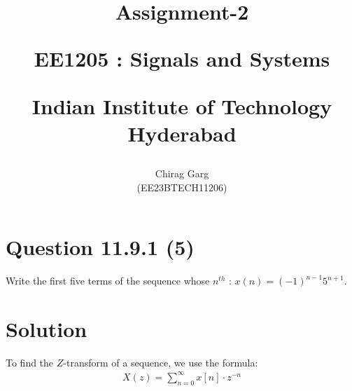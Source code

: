 \documentclass[journal,12pt,twocolumn]{IEEEtran}
\theoremstyle{remark}
\begin{document}
%




\vspace{3cm}

\title{
Assignment-2

\large{EE1205 : Signals and Systems}

Indian Institute of Technology Hyderabad
}
\author{Chirag Garg

(EE23BTECH11206)
}	





\maketitle

\newpage



\bigskip

\renewcommand{\thefigure}{\theenumi}
\renewcommand{\thetable}{\theenumi}


\section{Question 11.9.1 (5)}
\vspace{0.5cm}
\begin{flushleft}
 Write the first five terms of the sequence whose $n^{th}$  : $x(n) = (-1)^{n-1}5^{n+1}$.
\end{flushleft} 


\vspace{0.8cm}


\section{Solution} 






To find the $Z$-transform of a sequence, we use the formula:
\begin{align}
X(z) = \sum_{n=0}^{\infty} x[n] \cdot z^{-n} 
\end{align}
\end{document}
